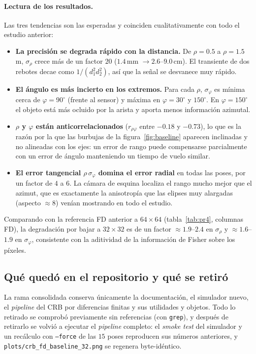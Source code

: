 \documentclass[11pt,a4paper]{article}
\newcommand{\code}[1]{\texttt{#1}}
\theoremstyle{definition}
\begin{document}
\paragraph{Lectura de los resultados.}
Las tres tendencias son las esperadas y coinciden cualitativamente con todo el
estudio anterior:
%
\begin{itemize}[leftmargin=*]
  \item \textbf{La precisión se degrada rápido con la distancia.} De $\rho=0.5$
        a $\rho=1.5\,$m, $\sigma_\rho$ crece más de un factor $20$
        ($1.4\,$mm $\to 2.6$--$9.0\,$cm). El transiente de dos rebotes decae
        como $1/(d_1^2 d_2^2)$, así que la señal se desvanece muy rápido.
  \item \textbf{El ángulo es más incierto en los extremos.} Para cada $\rho$,
        $\sigma_\varphi$ es mínima cerca de $\varphi=90^\circ$ (frente al
        sensor) y máxima en $\varphi=30^\circ$ y $150^\circ$. En
        $\varphi=150^\circ$ el objeto está más ocluido por la arista y aporta
        menos información azimutal.
  \item \textbf{$\rho$ y $\varphi$ están anticorrelacionados}
        ($r_{\rho\varphi}$ entre $-0.18$ y $-0.73$), lo que es la razón por la
        que las burbujas de la figura~\ref{fig:baseline} aparecen inclinadas y
        no alineadas con los ejes: un error de rango puede compensarse
        parcialmente con un error de ángulo manteniendo un tiempo de vuelo
        similar.
  \item \textbf{El error tangencial $\rho\,\sigma_\varphi$ domina el error
        radial} en todas las poses, por un factor de $4$ a $6$. La cámara de
        esquina localiza el rango mucho mejor que el azimut, que es
        exactamente la anisotropía que las elipses muy alargadas
        (aspecto $\approx8$) venían mostrando en todo el estudio.
\end{itemize}

Comparando con la referencia FD anterior a $64\times64$ (tabla~\ref{tab:pr4},
columnas FD), la degradación por bajar a $32\times32$ es de un factor
$\approx1.9$--$2.4$ en $\sigma_\rho$ y $\approx1.6$--$1.9$ en
$\sigma_\varphi$, consistente con la aditividad de la información de Fisher
sobre los píxeles.

\subsection{Qué quedó en el repositorio y qué se retiró}

La rama consolidada conserva únicamente la documentación, el simulador nuevo, el
\emph{pipeline} del CRB por diferencias finitas y sus utilidades y objetos. Todo
lo retirado se comprobó previamente sin referencias (con \code{grep}), y después
de retirarlo se volvió a ejecutar el \emph{pipeline} completo: el
\emph{smoke test} del simulador y un recálculo con \code{--force} de las $15$
poses reproducen sus números anteriores, y
\code{plots/crb\_fd\_baseline\_32.png} se regenera byte-idéntico.
\end{document}
